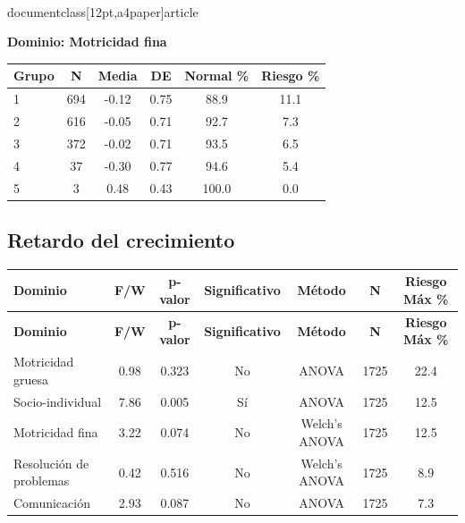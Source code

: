 \\documentclass[12pt,a4paper]{article}
\begin{document}
\vspace{0.5cm}


\textbf{Dominio: Motricidad fina}


\begin{center}
\begin{tabular}{|l|c|c|c|c|c|}
\hline
\textbf{Grupo} & \textbf{N} & \textbf{Media} & \textbf{DE} & \textbf{Normal \%} & \textbf{Riesgo \%} \\
\hline
1 & 694 & -0.12 & 0.75 & 88.9 & 11.1 \\
2 & 616 & -0.05 & 0.71 & 92.7 & 7.3 \\
3 & 372 & -0.02 & 0.71 & 93.5 & 6.5 \\
4 & 37 & -0.30 & 0.77 & 94.6 & 5.4 \\
5 & 3 & 0.48 & 0.43 & 100.0 & 0.0 \\

\hline
\end{tabular}
\end{center}


\vspace{0.5cm}


\subsection{Retardo del crecimiento}


\begin{longtable}{|l|c|c|c|c|c|c|}
\hline
\textbf{Dominio} & \textbf{F/W} & \textbf{p-valor} & \textbf{Significativo} & \textbf{Método} & \textbf{N} & \textbf{Riesgo Máx \%} \\
\hline
\endfirsthead

\hline
\textbf{Dominio} & \textbf{F/W} & \textbf{p-valor} & \textbf{Significativo} & \textbf{Método} & \textbf{N} & \textbf{Riesgo Máx \%} \\
\hline
\endhead

\hline
\endfoot

\hline
\endlastfoot

Motricidad gruesa & 0.98 & 0.323 & No & ANOVA & 1725 & 22.4 \\
Socio-individual & 7.86 & 0.005 & Sí & ANOVA & 1725 & 12.5 \\
Motricidad fina & 3.22 & 0.074 & No & Welch's ANOVA & 1725 & 12.5 \\
Resolución de problemas & 0.42 & 0.516 & No & Welch's ANOVA & 1725 & 8.9 \\
Comunicación & 2.93 & 0.087 & No & ANOVA & 1725 & 7.3 \\

\end{longtable}
\end{document}
